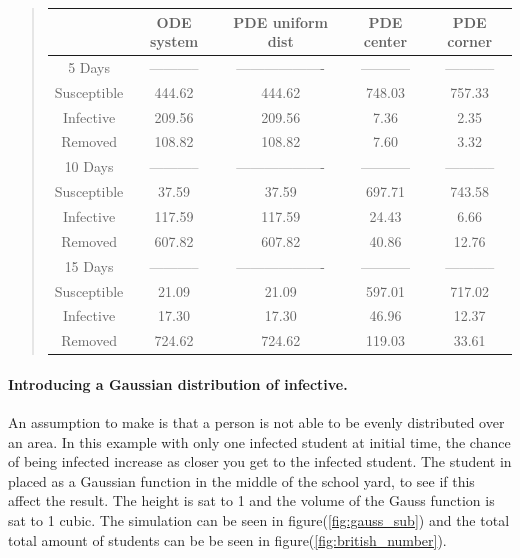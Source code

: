 \documentclass[%
twoside,                 %
final,                   %
10pt]{article}
\begin{document}
\label{table:british_number_table}

\begin{quote}
\begin{tabular}{ccccc}
\hline
\multicolumn{1}{c}{  } & \multicolumn{1}{c}{ ODE system } & \multicolumn{1}{c}{ PDE uniform dist } & \multicolumn{1}{c}{ PDE center } & \multicolumn{1}{c}{ PDE corner } \\
\hline
5 Days              & -----------         & ------------------- & -----------         & -----------         \\
\hline
Susceptible         & 444.62              & 444.62              & 748.03              & 757.33              \\
Infective           & 209.56              & 209.56              & 7.36                & 2.35                \\
Removed             & 108.82              & 108.82              & 7.60                & 3.32                \\
\hline
10 Days             & -----------         & ------------------- & -----------         & -----------         \\
\hline
Susceptible         & 37.59               & 37.59               & 697.71              & 743.58              \\
Infective           & 117.59              & 117.59              & 24.43               & 6.66                \\
Removed             & 607.82              & 607.82              & 40.86               & 12.76               \\
\hline
15 Days             & -----------         & ------------------- & -----------         & -----------         \\
\hline
Susceptible         & 21.09               & 21.09               & 597.01              & 717.02              \\
Infective           & 17.30               & 17.30               & 46.96               & 12.37               \\
Removed             & 724.62              & 724.62              & 119.03              & 33.61               \\
\hline
\end{tabular}
\end{quote}

\noindent

\paragraph{Introducing a Gaussian distribution of infective.}
An assumption to make is that a person is not able to be evenly distributed over an area. In this example with only one infected student at initial time, the chance of being infected increase as closer you get to the infected student. The student in placed as a Gaussian function in the middle of the school yard, to see if this affect the result. The height is sat to 1 and the volume of the Gauss function is sat to 1 cubic. The simulation can be seen in figure(\ref{fig:gauss_sub}) and the total total amount of students can be be seen in figure(\ref{fig:british_number}).
\end{document}
